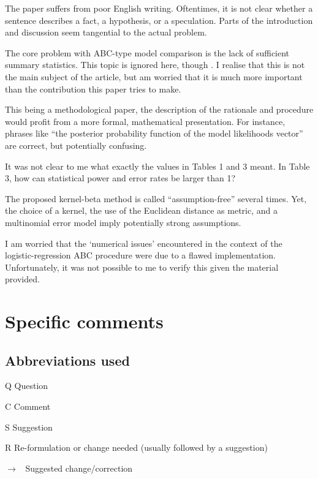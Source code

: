 \documentclass[11pt]{article}
\newenvironment{my_description}
{\begin{description}
  \setlength{\itemsep}{2pt}
  \setlength{\parskip}{0pt}
  \setlength{\parsep}{0pt}}
{\end{description}}
\newenvironment{my_enumerate}
{\begin{enumerate}
  \setlength{\itemsep}{2pt}
  \setlength{\parskip}{0pt}
  \setlength{\parsep}{0pt}}
{\end{enumerate}}
\newcommand{\ra}{$\rightarrow$\ }
\newcommand{\C}{\textbf{C:}\ }
\newcommand{\Q}{\textbf{Q:}\ }
\newcommand{\R}{\textbf{R:}\ }
\newcommand{\V}{\textbf{S:}\ }
\begin{document}
\begin{my_enumerate}
	\item The paper suffers from poor English writing. Oftentimes, it is not clear whether a sentence describes a fact, a hypothesis, or a speculation. Parts of the introduction and discussion seem tangential to the actual problem.
	\item The core problem with ABC-type model comparison is the lack of sufficient summary statistics. This topic is ignored here, though \cite[e.g.][]{Robert:2011fk}. I realise that this is not the main subject of the article, but am worried that it is much more important than the contribution this paper tries to make.
	\item This being a methodological paper, the description of the rationale and procedure would profit from a more formal, mathematical presentation. For instance, phrases like ``the posterior probability function of the model likelihoods vector'' are correct, but potentially confusing.
	\item It was not clear to me what exactly the values in Tables 1 and 3 meant. In Table 3, how can statistical power and error rates be larger than 1?
	\item The proposed kernel-beta method is called ``assumption-free'' several times. Yet, the choice of a kernel, the use of the Euclidean distance as metric, and a multinomial error model imply potentially strong assumptions.
	\item I am worried that the `numerical issues' encountered in the context of the logistic-regression ABC procedure were due to a flawed implementation. Unfortunately, it was not possible to me to verify this given the material provided.
\end{my_enumerate}
	

\section{Specific comments}

\subsection{Abbreviations used}
\begin{my_description}
	\item[Q] Question %
	\item[C] Comment %
	\item[S] Suggestion %
	\item[R] Re-formulation or change needed (usually followed by a suggestion) %
	\item[\ra] Suggested change/correction
\end{my_description}
\end{document}

